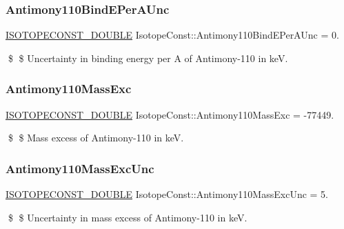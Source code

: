 \subsubsection{\texorpdfstring{Antimony110\+Bind\+E\+Per\+A\+Unc}{Antimony110BindEPerAUnc}}
{\footnotesize\ttfamily \mbox{\hyperlink{group___isotope_const-_macros_ga8f45a7272ce02c0b4c65c44636ed719a}{I\+S\+O\+T\+O\+P\+E\+C\+O\+N\+S\+T\+\_\+\+D\+O\+U\+B\+LE}} Isotope\+Const\+::\+Antimony110\+Bind\+E\+Per\+A\+Unc = 0.}

\$ \$ Uncertainty in binding energy per A of Antimony-\/110 in keV. \mbox{\label{group___isotope_const-_antimony-_sb110_ga21d2a42edaeb7d4419ff25929f4b0e2a}} 
\subsubsection{\texorpdfstring{Antimony110\+Mass\+Exc}{Antimony110MassExc}}
{\footnotesize\ttfamily \mbox{\hyperlink{group___isotope_const-_macros_ga8f45a7272ce02c0b4c65c44636ed719a}{I\+S\+O\+T\+O\+P\+E\+C\+O\+N\+S\+T\+\_\+\+D\+O\+U\+B\+LE}} Isotope\+Const\+::\+Antimony110\+Mass\+Exc = -\/77449.}

\$ \$ Mass excess of Antimony-\/110 in keV. \mbox{\label{group___isotope_const-_antimony-_sb110_ga47098f95938289aa69aa218a43379802}} 
\subsubsection{\texorpdfstring{Antimony110\+Mass\+Exc\+Unc}{Antimony110MassExcUnc}}
{\footnotesize\ttfamily \mbox{\hyperlink{group___isotope_const-_macros_ga8f45a7272ce02c0b4c65c44636ed719a}{I\+S\+O\+T\+O\+P\+E\+C\+O\+N\+S\+T\+\_\+\+D\+O\+U\+B\+LE}} Isotope\+Const\+::\+Antimony110\+Mass\+Exc\+Unc = 5.}

\$ \$ Uncertainty in mass excess of Antimony-\/110 in keV. \mbox{\label{group___isotope_const-_antimony-_sb110_ga78a04a3a82d7aa2d7e327424e53199b4}} 
